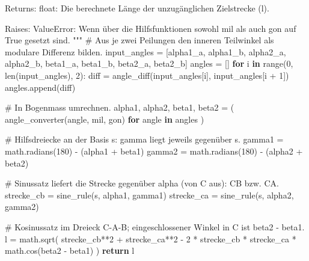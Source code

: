 \documentclass[
  nswissgerman,
  a4paper,
  DIV=11,
  numbers=noendperiod,
  ngerman]{scrreprt}
\newenvironment{Shaded}{\begin{snugshade}}{\end{snugshade}}
\newcommand{\BuiltInTok}[1]{\textcolor[rgb]{0.00,0.23,0.31}{#1}}
\newcommand{\CommentTok}[1]{\textcolor[rgb]{0.37,0.37,0.37}{#1}}
\newcommand{\ControlFlowTok}[1]{\textcolor[rgb]{0.00,0.23,0.31}{\textbf{#1}}}
\newcommand{\DecValTok}[1]{\textcolor[rgb]{0.68,0.00,0.00}{#1}}
\newcommand{\KeywordTok}[1]{\textcolor[rgb]{0.00,0.23,0.31}{\textbf{#1}}}
\newcommand{\NormalTok}[1]{\textcolor[rgb]{0.00,0.23,0.31}{#1}}
\newcommand{\OperatorTok}[1]{\textcolor[rgb]{0.37,0.37,0.37}{#1}}
\begin{document}
\begin{Shaded}
\begin{Highlighting}[numbers=left,,]
\CommentTok{    Returns:}
\CommentTok{        float: Die berechnete Länge der unzugänglichen Zielstrecke (l).}

\CommentTok{    Raises:}
\CommentTok{        ValueError: Wenn über die Hilfsfunktionen sowohl \textquotesingle{}mil\textquotesingle{} als auch \textquotesingle{}gon\textquotesingle{}}
\CommentTok{            auf True gesetzt sind.}
\CommentTok{    """}
    \CommentTok{\# Aus je zwei Peilungen den inneren Teilwinkel als modulare Differenz bilden.}
\NormalTok{    input\_angles }\OperatorTok{=}\NormalTok{ [alpha1\_a, alpha1\_b, alpha2\_a, alpha2\_b,}
\NormalTok{                    beta1\_a, beta1\_b, beta2\_a, beta2\_b]}
\NormalTok{    angles }\OperatorTok{=}\NormalTok{ []}
    \ControlFlowTok{for}\NormalTok{ i }\KeywordTok{in} \BuiltInTok{range}\NormalTok{(}\DecValTok{0}\NormalTok{, }\BuiltInTok{len}\NormalTok{(input\_angles), }\DecValTok{2}\NormalTok{):}
\NormalTok{        diff }\OperatorTok{=}\NormalTok{ angle\_diff(input\_angles[i], input\_angles[i }\OperatorTok{+} \DecValTok{1}\NormalTok{])}
\NormalTok{        angles.append(diff)}

    \CommentTok{\# In Bogenmass umrechnen.}
\NormalTok{    alpha1, alpha2, beta1, beta2 }\OperatorTok{=}\NormalTok{ (}
\NormalTok{        angle\_converter(angle, mil, gon) }\ControlFlowTok{for}\NormalTok{ angle }\KeywordTok{in}\NormalTok{ angles}
\NormalTok{    )}

    \CommentTok{\# Hilfsdreiecke an der Basis s: gamma liegt jeweils gegenüber s.}
\NormalTok{    gamma1 }\OperatorTok{=}\NormalTok{ math.radians(}\DecValTok{180}\NormalTok{) }\OperatorTok{{-}}\NormalTok{ (alpha1 }\OperatorTok{+}\NormalTok{ beta1)}
\NormalTok{    gamma2 }\OperatorTok{=}\NormalTok{ math.radians(}\DecValTok{180}\NormalTok{) }\OperatorTok{{-}}\NormalTok{ (alpha2 }\OperatorTok{+}\NormalTok{ beta2)}

    \CommentTok{\# Sinussatz liefert die Strecke gegenüber alpha (von C aus): CB bzw. CA.}
\NormalTok{    strecke\_cb }\OperatorTok{=}\NormalTok{ sine\_rule(s, alpha1, gamma1)}
\NormalTok{    strecke\_ca }\OperatorTok{=}\NormalTok{ sine\_rule(s, alpha2, gamma2)}

    \CommentTok{\# Kosinussatz im Dreieck C{-}A{-}B; eingeschlossener Winkel in C ist beta2 {-} beta1.}
\NormalTok{    l }\OperatorTok{=}\NormalTok{ math.sqrt(}
\NormalTok{        strecke\_cb}\OperatorTok{**}\DecValTok{2} \OperatorTok{+}\NormalTok{ strecke\_ca}\OperatorTok{**}\DecValTok{2}
        \OperatorTok{{-}} \DecValTok{2} \OperatorTok{*}\NormalTok{ strecke\_cb }\OperatorTok{*}\NormalTok{ strecke\_ca }\OperatorTok{*}\NormalTok{ math.cos(beta2 }\OperatorTok{{-}}\NormalTok{ beta1)}
\NormalTok{    )}
    \ControlFlowTok{return}\NormalTok{ l}
\end{Highlighting}
\end{Shaded}
\end{document}
